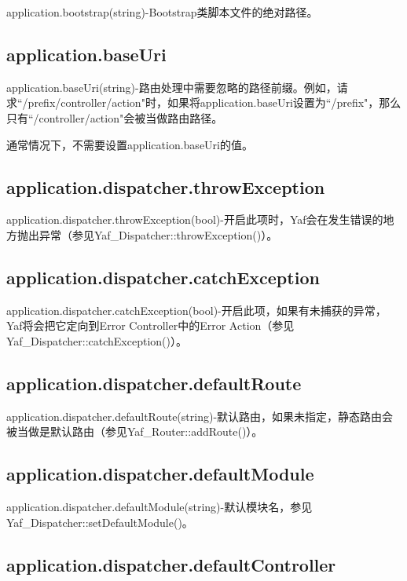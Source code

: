 application.bootstrap(string)-Bootstrap类脚本文件的绝对路径。

\subsection{application.baseUri}

application.baseUri(string)-路由处理中需要忽略的路径前缀。例如，请求``/prefix/controller/action"时，如果将application.baseUri设置为``/prefix"，那么只有``/controller/action"会被当做路由路径。

通常情况下，不需要设置application.baseUri的值。

\subsection{application.dispatcher.throwException}

application.dispatcher.throwException(bool)-开启此项时，Yaf会在发生错误的地方抛出异常（参见Yaf\_Dispatcher::throwException()）。


\subsection{application.dispatcher.catchException}


application.dispatcher.catchException(bool)-开启此项，如果有未捕获的异常，Yaf将会把它定向到Error Controller中的Error Action（参见Yaf\_Dispatcher::catchException()）。

\subsection{application.dispatcher.defaultRoute}

application.dispatcher.defaultRoute(string)-默认路由，如果未指定，静态路由会被当做是默认路由（参见Yaf\_Router::addRoute()）。

\subsection{application.dispatcher.defaultModule}


application.dispatcher.defaultModule(string)-默认模块名，参见Yaf\_Dispatcher::setDefaultModule()。


\subsection{application.dispatcher.defaultController}


